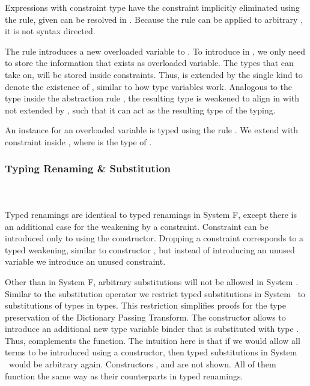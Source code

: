 \noindent Expressions  with constraint type \Constr{[}  \Constr{]⇒}  have the constraint implicitly eliminated using the  rule, given  can be resolved in . Because the rule can be applied to arbitrary , it is not syntax directed.

\noindent The rule  introduces a new overloaded variable  to . 
To introduce  in , we only need to store the information that  exists as overloaded variable. The types that  can take on, will be stored inside constraints. Thus,  is extended by the single kind  to denote the existence of , similar to how type variables work. 
Analogous to the type  inside the abstraction rule , the resulting type  is weakened to align in  with  not extended by , such that it can act as the resulting type of the typing.

\noindent An instance for an overloaded variable  is typed using the rule . We extend  with constraint  \Constr{:}  inside , where  is the type of . 

\subsubsection{Typing Renaming \& Substitution}\hfill\\\\
Typed renamings are identical to typed renamings in System F, except there is an additional case for the weakening by a constraint. 
\FoRenTyping
Constraint  \Constr{:}  can be introduced only to  using the  constructor. 
Dropping a constraint corresponds to a typed weakening, similar to constructor , but instead of introducing an unused variable we introduce an unused constraint.

\noindent Other than in System F, arbitrary substitutions will not be allowed in System \Fo. 
Similar to the substitution operator we restrict typed substitutions in System \Fo\ to substitutions of types in types. This restriction simplifies proofs for the type preservation of the Dictionary Passing Transform.
\FoSubTyping
\noindent The constructor  allows to introduce an additional new type variable binder that is substituted with type .
Thus,  complements the  function. The intuition here is that if we would allow all terms to be introduced using a  constructor, then typed substitutions in System \Fo\ would be arbitrary again.
Constructors ,  and are not shown. All of them function the same way as their counterparts in typed renamings.